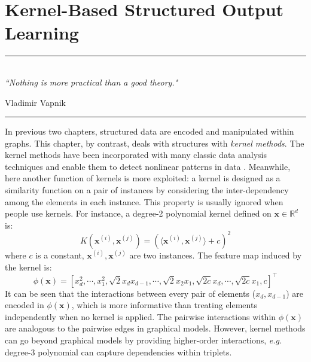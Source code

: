 
\chapter{Kernel-Based Structured Output Learning} %
\label{Chapter4} %

\rule{\textwidth}{0.4pt} \\[0.5cm]
\textit{``Nothing is more practical than a good theory."}

\begin{flushright}
Vladimir Vapnik
\end{flushright}
\rule{\textwidth}{0.4pt} 

In previous two chapters, structured data are encoded and manipulated within graphs. This chapter, by contrast, 
deals with structures with \emph{kernel methods}. The kernel methods have been incorporated with many classic data analysis 
techniques and enable them to detect nonlinear patterns in 
data \citep{citeulike:Taylor_Nello_Kernel}.   
Meanwhile, here another function of kernels is more exploited: a kernel is designed as a similarity function on a pair of instances by  
considering the inter-dependency among the elements in each instance. This property is usually ignored when people use kernels.   
For instance, a degree-2 polynomial kernel defined on $\mathbf{x}\in\mathbb{R}^d$ is:
\begin{equation}
    K(\mathbf{x}^{(i)},\mathbf{x}^{(j)})=\left(\langle \mathbf{x}^{(i)},\mathbf{x}^{(j)} \rangle +c\right)^2
\label{equ:pol_kernel}
\end{equation}
where $c$ is a constant, $\mathbf{x}^{(i)},\mathbf{x}^{(j)}$ are two instances. The feature map induced by the kernel is:      
\begin{equation}
    \phi(\mathbf{x})=[x_d^2,\cdots,x_1^2, \sqrt{2}x_d x_{d-1}, \cdots, \sqrt{2}x_2 x_{1}, \sqrt{2c}x_d,\cdots, \sqrt{2c}x_1,c]^\top 
     \label{equ:pol_feature_map}
\end{equation}
It can be seen that the interactions between every pair of elements ($x_d, x_{d-1}$) are encoded in $\phi(\mathbf{x})$, which is 
more informative than treating elements independently when no kernel is applied.  
The pairwise interactions within $\phi(\mathbf{x})$ are analogous to the pairwise edges in graphical models. However, kernel methods can go beyond graphical models by providing 
higher-order interactions, \emph{e.g.} degree-3 polynomial can capture dependencies within triplets.  

